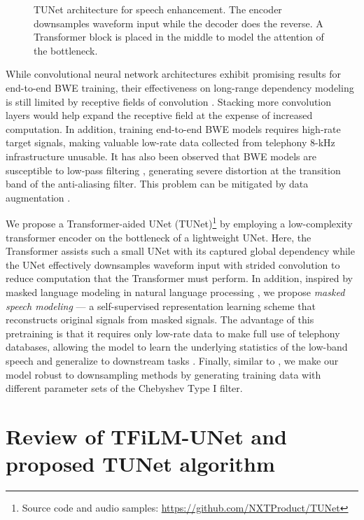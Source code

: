 \documentclass{article}
\begin{document}
\begin{figure*}[htb]
{\begin{tikzpicture}[x=0.85pt,y=0.60pt,yscale=-1,xscale=1]
\end{tikzpicture}
}


\caption{TUNet architecture for speech enhancement. The encoder downsamples waveform input while the decoder does the reverse. A Transformer block is placed in the middle to model the attention of the bottleneck.}
\label{fig:unet}
\end{figure*}

While convolutional neural network architectures exhibit promising results for end-to-end BWE training, their effectiveness on long-range dependency modeling is still limited by receptive fields of convolution \cite{10.5555/3326943.3326958}. Stacking more convolution layers would help expand the receptive field at the expense of increased computation. In addition, training end-to-end BWE models requires high-rate target signals, making valuable low-rate data collected from telephony 8-kHz infrastructure unusable. 
It has also been observed that BWE models are susceptible to low-pass filtering \cite{birnbaum2021temporal, Sulun_2021}, generating severe distortion at the transition band of the anti-aliasing filter. This problem can be mitigated by data augmentation \cite{Sulun_2021}.



We propose a Transformer-aided UNet (TUNet)\footnote{Source code and audio samples: \url{https://github.com/NXTProduct/TUNet}} by employing a low-complexity transformer encoder on the bottleneck of a lightweight UNet. Here, the Transformer assists such a small UNet with its captured global dependency while the UNet effectively downsamples waveform input with strided convolution to reduce computation that the Transformer must perform. In addition, inspired by masked language modeling in natural language processing \cite{devlin2019bert}, we propose \textit{masked speech modeling} --- a self-supervised representation learning scheme that reconstructs original signals from masked signals. The advantage of this pretraining is that it requires only low-rate data to make full use of telephony databases, allowing the model to learn the underlying statistics of the low-band speech and generalize to downstream tasks \cite{ssup1}. Finally, similar to \cite{Sulun_2021}, we make our model robust to downsampling methods by generating training data with different parameter sets of the Chebyshev Type I filter. \vspace{-0.2cm}



 
\section{Review of TFiLM-UNet and proposed TUNet algorithm  }
\vspace{-0.2cm}
\end{document}
